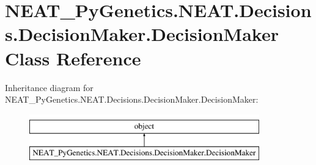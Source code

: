 \hypertarget{class_n_e_a_t___py_genetics_1_1_n_e_a_t_1_1_decisions_1_1_decision_maker_1_1_decision_maker}{}\section{N\+E\+A\+T\+\_\+\+Py\+Genetics.\+N\+E\+A\+T.\+Decisions.\+Decision\+Maker.\+Decision\+Maker Class Reference}
\label{class_n_e_a_t___py_genetics_1_1_n_e_a_t_1_1_decisions_1_1_decision_maker_1_1_decision_maker}
Inheritance diagram for N\+E\+A\+T\+\_\+\+Py\+Genetics.\+N\+E\+A\+T.\+Decisions.\+Decision\+Maker.\+Decision\+Maker\+:\begin{figure}[H]
\begin{center}
\leavevmode
\includegraphics[height=2.000000cm]{class_n_e_a_t___py_genetics_1_1_n_e_a_t_1_1_decisions_1_1_decision_maker_1_1_decision_maker}
\end{center}
\end{figure}
